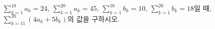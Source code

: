 $\displaystyle\sum_{k=1}^{10} a_k=24$, $\displaystyle\sum_{k=1}^{20} a_k=45$, $\displaystyle\sum_{k=1}^{10} b_k=10$, $\displaystyle\sum_{k=1}^{20} b_k=18$일 때, $\displaystyle\sum_{k=11}^{20} (4a_k+5b_k)$의 값을 구하시오.

